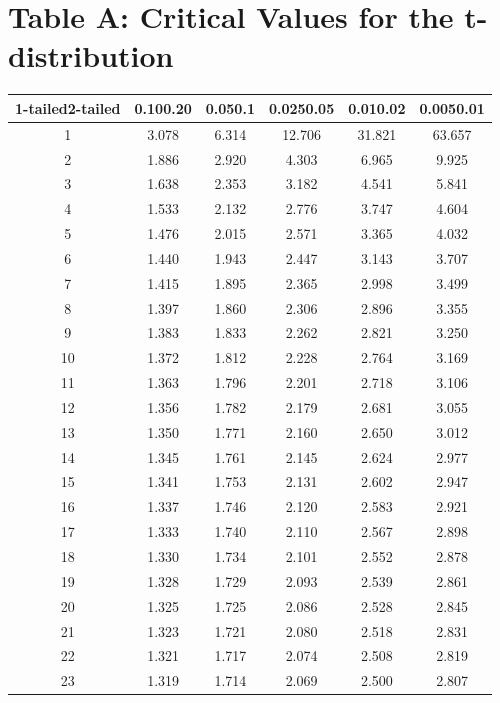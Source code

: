 \documentclass[
]{book}
\theoremstyle{definition}
\theoremstyle{definition}
\theoremstyle{definition}
\theoremstyle{definition}
\theoremstyle{remark}
\begin{document}
\hypertarget{table-a-critical-values-for-the-t-distribution}{%
\section*{Table A: Critical Values for the t-distribution}\label{table-a-critical-values-for-the-t-distribution}}

\begin{longtable}[]{@{}cccccc@{}}
\toprule()
1-tailed2-tailed & 0.100.20 & 0.050.1 & 0.0250.05 & 0.010.02 & 0.0050.01 \\
\midrule()
\endhead
1 & 3.078 & 6.314 & 12.706 & 31.821 & 63.657 \\
2 & 1.886 & 2.920 & 4.303 & 6.965 & 9.925 \\
3 & 1.638 & 2.353 & 3.182 & 4.541 & 5.841 \\
4 & 1.533 & 2.132 & 2.776 & 3.747 & 4.604 \\
5 & 1.476 & 2.015 & 2.571 & 3.365 & 4.032 \\
6 & 1.440 & 1.943 & 2.447 & 3.143 & 3.707 \\
7 & 1.415 & 1.895 & 2.365 & 2.998 & 3.499 \\
8 & 1.397 & 1.860 & 2.306 & 2.896 & 3.355 \\
9 & 1.383 & 1.833 & 2.262 & 2.821 & 3.250 \\
10 & 1.372 & 1.812 & 2.228 & 2.764 & 3.169 \\
11 & 1.363 & 1.796 & 2.201 & 2.718 & 3.106 \\
12 & 1.356 & 1.782 & 2.179 & 2.681 & 3.055 \\
13 & 1.350 & 1.771 & 2.160 & 2.650 & 3.012 \\
14 & 1.345 & 1.761 & 2.145 & 2.624 & 2.977 \\
15 & 1.341 & 1.753 & 2.131 & 2.602 & 2.947 \\
16 & 1.337 & 1.746 & 2.120 & 2.583 & 2.921 \\
17 & 1.333 & 1.740 & 2.110 & 2.567 & 2.898 \\
18 & 1.330 & 1.734 & 2.101 & 2.552 & 2.878 \\
19 & 1.328 & 1.729 & 2.093 & 2.539 & 2.861 \\
20 & 1.325 & 1.725 & 2.086 & 2.528 & 2.845 \\
21 & 1.323 & 1.721 & 2.080 & 2.518 & 2.831 \\
22 & 1.321 & 1.717 & 2.074 & 2.508 & 2.819 \\
23 & 1.319 & 1.714 & 2.069 & 2.500 & 2.807 \\

\end{longtable}
\end{document}
